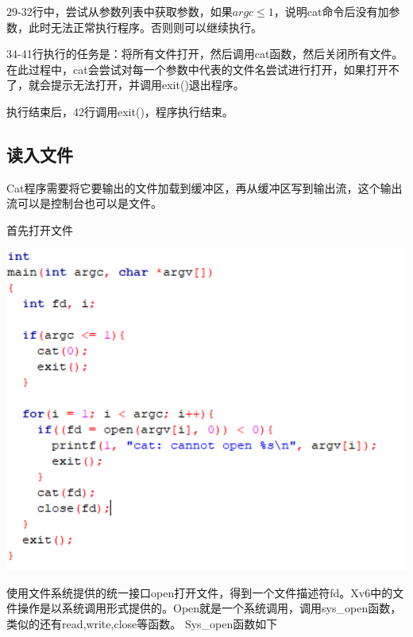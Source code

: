 29-32行中，尝试从参数列表中获取参数，如果$argc \leq 1$，说明cat命令后没有加参数，此时无法正常执行程序。否则则可以继续执行。

34-41行执行的任务是：将所有文件打开，然后调用cat函数，然后关闭所有文件。在此过程中，cat会尝试对每一个参数中代表的文件名尝试进行打开，如果打开不了，就会提示无法打开，并调用exit()退出程序。

执行结束后，42行调用exit()，程序执行结束。

\subsection{读入文件}

Cat程序需要将它要输出的文件加载到缓冲区，再从缓冲区写到输出流，这个输出流可以是控制台也可以是文件。

首先打开文件

\includegraphics[width=6in]{figures/eg_file/image168.png}

使用文件系统提供的统一接口open打开文件，得到一个文件描述符fd。Xv6中的文件操作是以系统调用形式提供的。Open就是一个系统调用，调用sys\_open函数，类似的还有read,write,close等函数。
Sys\_open函数如下

